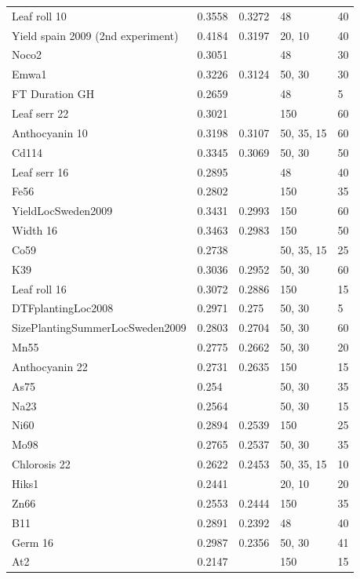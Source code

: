 \begin{longtable}{p{} p{} p{} p{} p{}}
 Leaf roll 10 & 0.3558 & 0.3272 & 48 & 40 \\
 Yield spain 2009 (2nd experiment) & 0.4184 & 0.3197 & 20, 10 & 40 \\
 Noco2 & 0.3051 & \color{red}{0.3174} & 48 & 30 \\
 Emwa1 & 0.3226 & 0.3124 & 50, 30 & 30 \\
 FT Duration GH & 0.2659 & \color{red}{0.3123} & 48 & 5 \\
 Leaf serr 22 & 0.3021 & \color{red}{0.3108} & 150 & 60 \\
 Anthocyanin 10 & 0.3198 & 0.3107 & 50, 35, 15 & 60 \\
 Cd114 & 0.3345 & 0.3069 & 50, 30 & 50 \\
 Leaf serr 16 & 0.2895 & \color{red}{0.3011} & 48 & 40 \\
 Fe56 & 0.2802 & \color{red}{0.3006} & 150 & 35 \\
 YieldLocSweden2009 & 0.3431 & 0.2993 & 150 & 60 \\
 Width 16 & 0.3463 & 0.2983 & 150 & 50 \\
 Co59 & 0.2738 & \color{red}{0.2953} & 50, 35, 15 & 25 \\
 K39 & 0.3036 & 0.2952 & 50, 30 & 60 \\
 Leaf roll 16 & 0.3072 & 0.2886 & 150 & 15 \\
 DTFplantingLoc2008 & 0.2971 & 0.275 & 50, 30 & 5 \\
 SizePlantingSummerLocSweden2009 & 0.2803 & 0.2704 & 50, 30 & 60 \\
 Mn55 & 0.2775 & 0.2662 & 50, 30 & 20 \\
 Anthocyanin 22 & 0.2731 & 0.2635 & 150 & 15 \\
 As75 & 0.254 & \color{red}{0.2619} & 50, 30 & 35 \\
 Na23 & 0.2564 & \color{red}{0.2598} & 50, 30 & 15 \\
 Ni60 & 0.2894 & 0.2539 & 150 & 25 \\
 Mo98 & 0.2765 & 0.2537 & 50, 30 & 35 \\
 Chlorosis 22 & 0.2622 & 0.2453 & 50, 35, 15 & 10 \\
 Hiks1 & 0.2441 & \color{red}{0.2452} & 20, 10 & 20 \\
 Zn66 & 0.2553 & 0.2444 & 150 & 35 \\
 B11 & 0.2891 & 0.2392 & 48 & 40 \\
 Germ 16 & 0.2987 & 0.2356 & 50, 30 & 41 \\
 At2 & 0.2147 & \color{red}{0.216} & 150 & 15 \\

\end{longtable}
